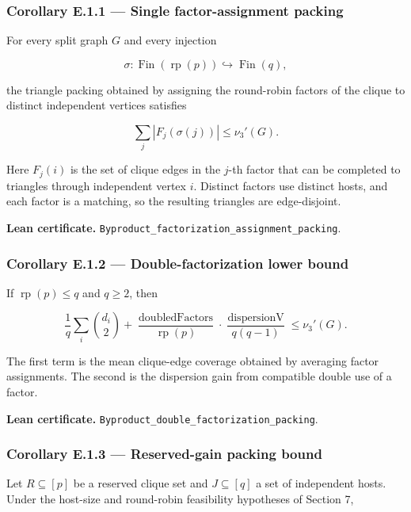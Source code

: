 \documentclass[
  american,
  11pt,
  a4paper,
]{article}
\begin{document}
\subsubsection{Corollary E.1.1 --- Single factor-assignment packing}\label{corollary-e.1.1-single-factor-assignment-packing}

For every split graph \(G\) and every injection

\[
\sigma:\operatorname{Fin}(\operatorname{rp}(p))\hookrightarrow \operatorname{Fin}(q),
\]

the triangle packing obtained by assigning the round-robin factors of the clique to distinct independent vertices satisfies

\[
\sum_j |F_j(\sigma(j))|\le \nu_3'(G).
\]

Here \(F_j(i)\) is the set of clique edges in the \(j\)-th factor that can be completed to triangles through independent vertex \(i\). Distinct factors use distinct hosts, and each factor is a matching, so the resulting triangles are edge-disjoint.

\textbf{Lean certificate.} \texttt{Byproduct\_factorization\_assignment\_packing}.

\subsubsection{Corollary E.1.2 --- Double-factorization lower bound}\label{corollary-e.1.2-double-factorization-lower-bound}

If \(\operatorname{rp}(p)\le q\) and \(q\ge2\), then

\[
\frac1q\sum_i \binom{d_i}{2}
+
\frac{\operatorname{doubledFactors}}{\operatorname{rp}(p)}
\cdot
\frac{\operatorname{dispersionV}}{q(q-1)}
\le \nu_3'(G).
\]

The first term is the mean clique-edge coverage obtained by averaging factor assignments. The second is the dispersion gain from compatible double use of a factor.

\textbf{Lean certificate.} \texttt{Byproduct\_double\_factorization\_packing}.

\subsubsection{Corollary E.1.3 --- Reserved-gain packing bound}\label{corollary-e.1.3-reserved-gain-packing-bound}

Let \(R\subseteq[p]\) be a reserved clique set and \(J\subseteq[q]\) a set of independent hosts. Under the host-size and round-robin feasibility hypotheses of Section 7,
\end{document}
